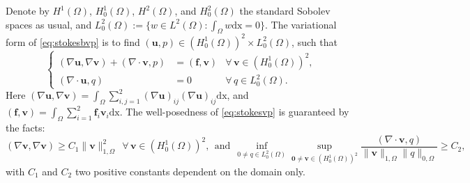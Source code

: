 \documentclass[12pt,showkeys]{amsart}
\begin{document}
Denote by $H^1(\Omega)$, $H^1_0(\Omega)$, $H^2(\Omega)$, and $H^2_0(\Omega)$ the standard Sobolev spaces as usual, and $L^2_0(\Omega):=\{w\in L^2(\Omega):\int_\Omega w{\mathrm{dx}}=0\}$. The variational form of \eqref{eq:stokesbvp} is to find $(\mathbf{u},p)\in (H^1_0(\Omega))^2\times L^2_0(\Omega)$, such that 
\begin{equation}\label{eq:stokesvp}
\left\{
\begin{array}{rll}
(\nabla\mathbf{u},\nabla\mathbf{v})+(\nabla\cdot\mathbf{v},p)&=(\mathbf{f},\mathbf{v}) & \forall\,\mathbf{v}\in (H^1_0(\Omega))^2, \\ 
(\nabla\cdot\mathbf{u},q)&=0 & \forall\,q\in L^2_0(\Omega).
\end{array}
\right.
\end{equation}
Here $(\nabla \mathbf{u},\nabla\mathbf{v})=\int_\Omega\sum_{i,j=1}^2(\nabla\mathbf{u})_{ij}(\nabla\mathbf{u})_{ij}{\mathrm{dx}}$, and $(\mathbf{f},\mathbf{v})=\int_\Omega\sum_{i=1}^2\mathbf{f}_i\mathbf{v}_i{\mathrm{dx}}$. The well-posedness of \eqref{eq:stokesvp} is guaranteed by the facts\cite{Girault.V;Raviart.P}:
\begin{equation}\label{eq:contsta}
(\nabla\mathbf{v},\nabla\mathbf{v})\geqslant C_1 \|\mathbf{v}\|_{1,\Omega}^2\ \ \forall\,\mathbf{v}\in (H^1_0(\Omega))^2,\ \ \mbox{and}\ \ \inf_{0\neq q\in L^2_0(\Omega)}\sup_{\mathbf{0}\neq\mathbf{v}\in (H^1_0(\Omega))^2}\frac{(\nabla\cdot\mathbf{v},q)}{\|\mathbf{v}\|_{1,\Omega}\|q\|_{0,\Omega}}\geqslant C_2,
\end{equation}
with $C_1$ and $C_2$ two positive constants dependent on the domain only. 
\end{document}
